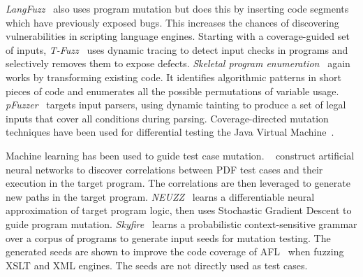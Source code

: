 \emph{LangFuzz}~\cite{Holler2012} also uses program mutation but does this by inserting code segments which have previously exposed bugs. This increases the chances of discovering vulnerabilities in scripting language engines.
Starting with a coverage-guided set of inputs, \emph{T-Fuzz}~\cite{Peng2018} uses dynamic tracing to detect input checks in programs and selectively removes them to expose defects.
\emph{Skeletal program enumeration}~\cite{Zhang2017a} again works by transforming existing code. It identifies algorithmic patterns in short pieces of code and enumerates all the possible permutations of variable usage.
\emph{pFuzzer}~\cite{Mathis2019} targets input parsers, using dynamic tainting to produce a set of legal inputs that cover all conditions during parsing.
Coverage-directed mutation techniques have been used for differential testing the Java Virtual Machine~\cite{Chen2016b}.

Machine learning has been used to guide test case mutation.
\citeauthor{Cheng2019}~\cite{Cheng2019} construct artificial neural networks to discover correlations between PDF test cases and their execution in the target program. The correlations are then leveraged to generate new paths in the target program.
\emph{NEUZZ}~\cite{She2018} learns a differentiable neural approximation of target program logic, then uses Stochastic Gradient Descent to guide program mutation.
\emph{Skyfire}~\cite{Wang2017c} learns a probabilistic context-sensitive grammar over a corpus of programs to generate input seeds for mutation testing. The generated seeds are shown to improve the code coverage of AFL~\cite{Zalewski} when fuzzing XSLT and XML engines. The seeds are not directly used as test cases.

